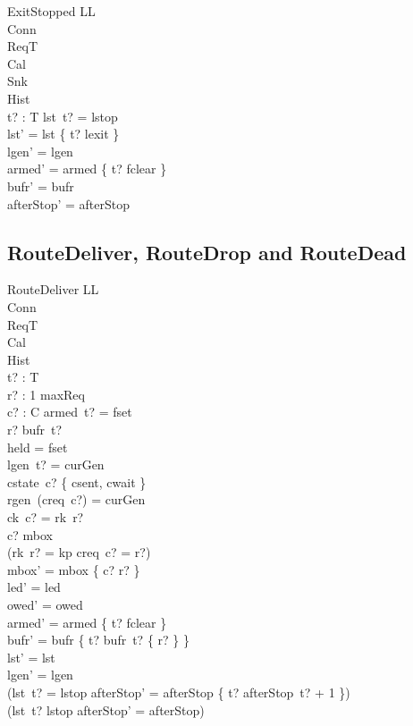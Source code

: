 \documentclass[a4paper,10pt,fleqn]{article}
\begin{document}
\begin{schema}{ExitStopped}
  \Delta LL \\
  \Xi Conn \\
  \Xi ReqT \\
  \Xi Cal \\
  \Xi Snk \\
  \Xi Hist \\
  t? : T
\where
  lst~t? = lstop \\
  lst' = lst \oplus \{ t? \mapsto lexit \} \\
  lgen' = lgen \\
  armed' = armed \oplus \{ t? \mapsto fclear \} \\
  bufr' = bufr \\
  afterStop' = afterStop
\end{schema}

\subsection{RouteDeliver, RouteDrop and RouteDead}

\begin{schema}{RouteDeliver}
  \Delta LL \\
  \Xi Conn \\
  \Xi ReqT \\
  \Xi Cal \\
  \Xi Hist \\
  t? : T \\
  r? : 1 \upto maxReq \\
  c? : C
\where
  armed~t? = fset \\
  r? \in bufr~t? \\
  held = fset \\
  lgen~t? = curGen \\
  cstate~c? \in \{ csent, cwait \} \\
  rgen~(creq~c?) = curGen \\
  ck~c? = rk~r? \\
  c? \notin \dom mbox \\
  (rk~r? = kp \implies creq~c? = r?) \\
  mbox' = mbox \cup \{ c? \mapsto r? \} \\
  led' = led \\
  owed' = owed \\
  armed' = armed \oplus \{ t? \mapsto fclear \} \\
  bufr' = bufr \oplus \{ t? \mapsto bufr~t? \setminus \{ r? \} \} \\
  lst' = lst \\
  lgen' = lgen \\
  (lst~t? = lstop \implies
    afterStop' = afterStop \oplus \{ t? \mapsto afterStop~t? + 1 \}) \\
  (lst~t? \neq lstop \implies afterStop' = afterStop)
\end{schema}
\end{document}
